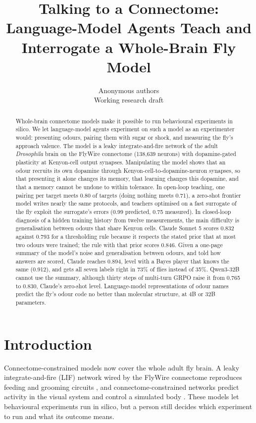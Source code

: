 \documentclass{article}
\title{Talking to a Connectome: Language-Model Agents Teach and Interrogate a Whole-Brain Fly Model}
\author{Anonymous authors\\Working research draft}
\begin{document}
\maketitle

\begin{abstract}
Whole-brain connectome models make it possible to run behavioural experiments in silico. We let language-model agents experiment on such a model as an experimenter would: presenting odours, pairing them with sugar or shock, and measuring the fly's approach valence. The model is a leaky integrate-and-fire network of the adult \emph{Drosophila} brain on the FlyWire connectome (138{,}639 neurons) with dopamine-gated plasticity at Kenyon-cell output synapses. Manipulating the model shows that an odour recruits its own dopamine through Kenyon-cell-to-dopamine-neuron synapses, so that presenting it alone changes its memory, that learning changes this dopamine, and that a memory cannot be undone to within tolerance. In open-loop teaching, one pairing per target meets 0.80 of targets (doing nothing meets 0.71), a zero-shot frontier model writes nearly the same protocols, and teachers optimised on a fast surrogate of the fly exploit the surrogate's errors (0.99 predicted, 0.75 measured). In closed-loop diagnosis of a hidden training history from twelve measurements, the main difficulty is generalisation between odours that share Kenyon cells. Claude Sonnet 5 scores 0.832 against 0.793 for a thresholding rule because it respects the stated prior that at most two odours were trained; the rule with that prior scores 0.846. Given a one-page summary of the model's noise and generalisation between odours, and told how answers are scored, Claude reaches 0.894, level with a Bayes player that knows the same (0.912), and gets all seven labels right in 73\% of flies instead of 35\%. Qwen3-32B cannot use the summary, although thirty steps of multi-turn GRPO raise it from 0.765 to 0.830, Claude's zero-shot level. Language-model representations of odour names predict the fly's odour code no better than molecular structure, at 4B or 32B parameters.
\end{abstract}

\section{Introduction}
Connectome-constrained models now cover the whole adult fly brain. A leaky integrate-and-fire (LIF) network wired by the FlyWire connectome \citep{dorkenwald2024,schlegel2024} reproduces feeding and grooming circuits \citep{shiu2024}, and connectome-constrained networks predict activity in the visual system \citep{lappalainen2024} and control a simulated body \citep{jin2026}. These models let behavioural experiments run in silico, but a person still decides which experiment to run and what its outcome means.
\end{document}
